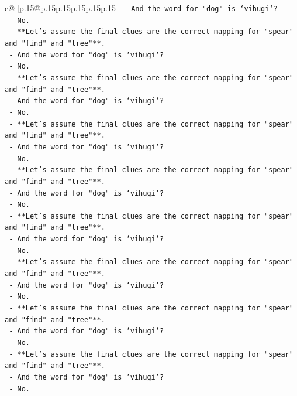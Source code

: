\documentclass{article}
\begin{document}
{\begin{supertabular}{c@{$\;$}|p{.15\linewidth}@{}p{.15\linewidth}p{.15\linewidth}p{.15\linewidth}p{.15\linewidth}p{.15\linewidth}}
{{{\texttt{  {-} And the word for "dog" is `vihugi`?} \\
\texttt{  {-} No.} \\
\texttt{  {-} **Let's assume the final clues are the correct mapping for "spear" and "find" and "tree"**.} \\
\texttt{  {-} And the word for "dog" is `vihugi`?} \\
\texttt{  {-} No.} \\
\texttt{  {-} **Let's assume the final clues are the correct mapping for "spear" and "find" and "tree"**.} \\
\texttt{  {-} And the word for "dog" is `vihugi`?} \\
\texttt{  {-} No.} \\
\texttt{  {-} **Let's assume the final clues are the correct mapping for "spear" and "find" and "tree"**.} \\
\texttt{  {-} And the word for "dog" is `vihugi`?} \\
\texttt{  {-} No.} \\
\texttt{  {-} **Let's assume the final clues are the correct mapping for "spear" and "find" and "tree"**.} \\
\texttt{  {-} And the word for "dog" is `vihugi`?} \\
\texttt{  {-} No.} \\
\texttt{  {-} **Let's assume the final clues are the correct mapping for "spear" and "find" and "tree"**.} \\
\texttt{  {-} And the word for "dog" is `vihugi`?} \\
\texttt{  {-} No.} \\
\texttt{  {-} **Let's assume the final clues are the correct mapping for "spear" and "find" and "tree"**.} \\
\texttt{  {-} And the word for "dog" is `vihugi`?} \\
\texttt{  {-} No.} \\
\texttt{  {-} **Let's assume the final clues are the correct mapping for "spear" and "find" and "tree"**.} \\
\texttt{  {-} And the word for "dog" is `vihugi`?} \\
\texttt{  {-} No.} \\
\texttt{  {-} **Let's assume the final clues are the correct mapping for "spear" and "find" and "tree"**.} \\
\texttt{  {-} And the word for "dog" is `vihugi`?} \\
\texttt{  {-} No.} \\
}}}
\end{supertabular}}
\end{document}
